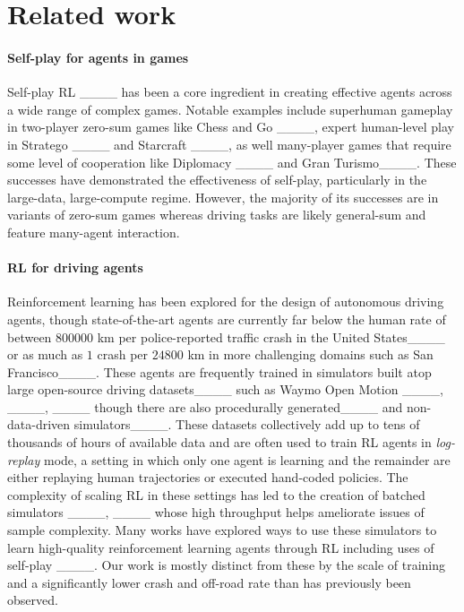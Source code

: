 \section{Related work}
\paragraph{Self-play for agents in games}
Self-play RL ____ has been a core ingredient in creating effective agents across a wide range of complex games. Notable examples include superhuman gameplay in two-player zero-sum games like Chess and Go ____, expert human-level play in Stratego ____ and Starcraft ____, as well many-player games that require some level of cooperation like Diplomacy ____ and Gran Turismo____. These successes have demonstrated the effectiveness of self-play, particularly in the large-data, large-compute regime. However, the majority of its successes are in variants of zero-sum games whereas driving tasks are likely general-sum and feature many-agent interaction.

\paragraph{RL for driving agents}
Reinforcement learning has been explored for the design of autonomous driving agents, though state-of-the-art agents are currently far below the human rate of between $800000$ km per police-reported traffic crash in the United States____ or as much as $1$ crash per $24800$ km in more challenging domains such as San Francisco____. These agents are frequently trained in simulators built atop large open-source driving datasets____ such as Waymo Open Motion ____, ____, ____ though there are also procedurally generated____ and non-data-driven simulators____. These datasets collectively add up to tens of thousands of hours of available data and are often used to train RL agents in \emph{log-replay} mode, a setting in which only one agent is learning and the remainder are either replaying human trajectories or executed hand-coded policies. The complexity of scaling RL in these settings has led to the creation of batched simulators ____, ____ whose high throughput helps ameliorate issues of sample complexity. Many works have explored ways to use these simulators to learn high-quality reinforcement learning agents through RL including uses of self-play ____. Our work is mostly distinct from these by the scale of training and a significantly lower crash and off-road rate than has previously been observed. 


